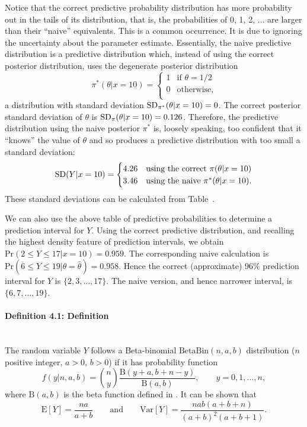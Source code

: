{Notice that the correct predictive probability distribution has more
probability out in the tails of its distribution, that is, the
probabilities of 0, 1, 2, $\ldots$ are larger than their ``naive''
equivalents. This is a common occurrence. It is due to ignoring the
uncertainty about the parameter estimate. Essentially, the naive
predictive distribution is a predictive distribution which, instead of
using the correct posterior distribution, uses the degenerate
posterior distribution
\begin{equation*}
\pi^*(\theta|x=10)=\begin{cases} 1 & \text{if } \theta=1/2 \\
                                 0 & \text{otherwise}, \\
              \end{cases}
\end{equation*}
a distribution with standard deviation $\textnormal{SD}_{\pi^*}(\theta|x=10)=0$.
The correct posterior standard deviation of $\theta$ is
$\textnormal{SD}_\pi(\theta|x=10)=0.126$.  Therefore, the predictive distribution
using the naive posterior $\pi^*$ is, loosely speaking, too confident
that it ``knows'' the value of $\theta$ and so produces a predictive
distribution with too small a standard deviation:
\begin{equation*}
\textnormal{SD}(Y|x=10)=
\begin{cases} 4.26  & \text{using the correct }\pi(\theta|x=10) \\
              3.46  & \text{using the naive }\pi^*(\theta|x=10). \\
         \end{cases}
\end{equation*}
These standard deviations can be calculated from
Table~. 



We can also use the above table of predictive probabilities to determine a
prediction interval for $Y$. Using the correct predictive
distribution, and recalling the highest density feature of prediction
intervals, we obtain $\text{Pr}(2\leq Y\leq 17|x=10)=0.959$. The
corresponding naive calculation is $\text{Pr}(6\leq Y\leq
19|\theta=\hat{\theta})=0.958$. Hence the correct (approximate) 96\%
prediction interval for $Y$ is $\{2,3,\ldots,17\}$. The naive version,
and hence narrower interval, is $\{6,7,\ldots,19\}$.}

\paragraph{Definition 4.1: Definition}{~\\
The random variable $Y$ follows a Beta-binomial $\mathrm{BetaBin}(n,a,b)$
distribution ($n$ positive integer, $a>0$, $b>0$) if it has
probability function
$$f(y|n,a,b)=\binom{n}{y}\frac{\mathrm{B}(y+a,b+n-y)}{\mathrm{B}(a,b)}, \quad\quad
y=0,1,\ldots,n,$$ 
where $\mathrm{B}(a,b)$ is the beta function defined in . It can be shown that
$$\text{E}[Y] =\frac{na}{a+b}\quad\quad\text{and}\quad\quad
\text{Var}[Y]=\frac{nab(a+b+n)}{(a+b)^2(a+b+1)}. $$}

